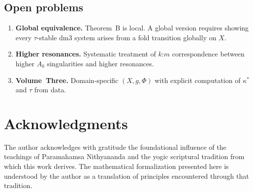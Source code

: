 \documentclass[12pt, oneside]{book}
\theoremstyle{plain}
\theoremstyle{definition}
\theoremstyle{remark}
\begin{document}
\subsection{Open problems}

\begin{enumerate}[label=(\arabic*)]
  \item \textbf{Global equivalence.} Theorem~B is local.
        A global version requires showing every $\tau$-stable
        dm3 system arises from a fold transition globally on $X$.
  \item \textbf{Higher resonances.} Systematic treatment of
        $k$:$m$ correspondence between higher $A_k$ singularities
        and higher resonances.
  \item \textbf{Volume~Three.} Domain-specific $(X,g,\Phi)$
        with explicit computation of $\kappa^*$ and $\tau$ from
        data.
\end{enumerate}

\section*{Acknowledgments}

The author acknowledges with gratitude the foundational influence
of the teachings of Paramahamsa Nithyananda and the yogic
scriptural tradition from which this work derives. The mathematical
formalization presented here is understood by the author as a
translation of principles encountered through that tradition.
\end{document}

